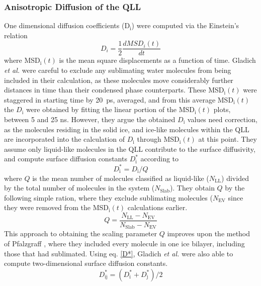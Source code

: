 \subsubsection{Anisotropic Diffusion of the QLL}
One dimensional diffusion coefficients (D$_\mathrm{i}$) were computed
via the Einstein's relation\cite{Allen1987}
\begin{equation}
D_{i} = \frac{1}{2} \frac{dMSD_{i}(t)}{dt}
\end{equation}
where MSD$_\mathrm{i}(t)$ is the mean square displacements as a
function of time. Gladich \textit{et al.} were careful to exclude any
sublimating water molecules from being included in their calculation,
as these molecules move considerably further distances in time than
their condensed phase counterparts. These MSD$_\mathrm{i}(t)$ were
staggered in starting time by 20~ps, averaged, and from this average
MSD$_\mathrm{i}(t)$ the $D_\mathrm{i}$ were obtained by fitting the
linear portion of the MSD$_\mathrm{i}(t)$ plots, between 5 and 25
ns. However, they argue the obtained $D_\mathrm{i}$ values need
correction, as the molecules residing in the solid ice, and ice-like
molecules within the QLL are incorporated into the calculation of
$D_\mathrm{i}$ through MSD$_\mathrm{i}(t)$ at this point. They assume
only liquid-like molecules in the QLL contribute to the surface
diffusivity, and compute surface diffusion constants
$D^{*}_\mathrm{i}$ according to\cite{Pfalzgraff2011}
\begin{equation}\label{D*}
D^{*}_\mathrm{i} = D_\mathrm{i}/Q
\end{equation}
where $Q$ is the mean number of molecules classified as liquid-like
($N_\mathrm{LL}$) divided by the total number of molecules in the
system ($N_\mathrm{Slab}$). They obtain $Q$ by the following simple
ration, where they exclude sublimating molecules ($N_\mathrm{EV}$
since they were removed from the MSD$_\mathrm{i}(t)$ calculations
earlier.
\begin{equation}
Q = \frac{N_\mathrm{LL} - N_\mathrm{EV}}{N_\mathrm{Slab} -
  N_\mathrm{EV}}
\end{equation}
This approach to obtaining the scaling parameter $Q$ improves upon the
method of Pfalzgraff \cite{Pfalzgraff2011}, where they included every
molecule in one ice bilayer, including those that had
sublimated. Using eq. \eqref{D*}, Gladich \textit{et al.} were also
able to compute two-dimensional surface diffusion constants.
\begin{equation}
D^{*}_\mathrm{ij} = (D^{*}_\mathrm{i} + D^{*}_\mathrm{j}) / 2
\end{equation} 

